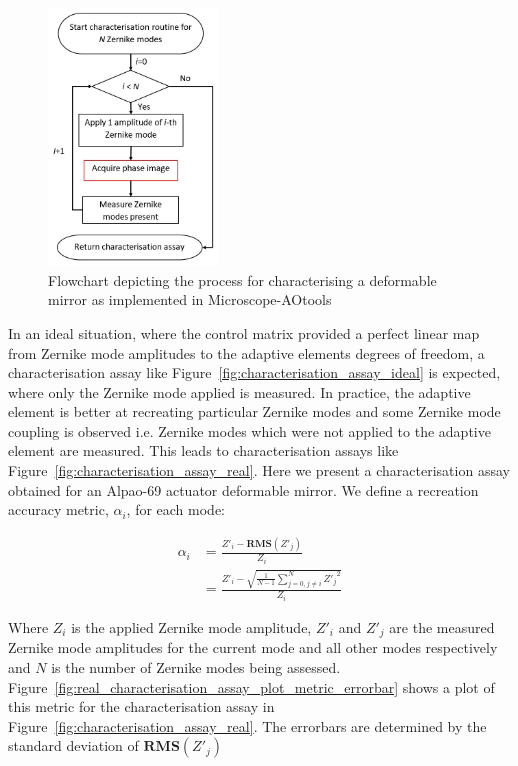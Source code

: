 \begin{figure}[h]
	\centering
	\includegraphics[width=0.4\textwidth, scale=0.5]{./images/characterisation_workflow.jpg}
	\caption[Characterisation routine workflow]{Flowchart depicting the process for characterising a deformable mirror as implemented in Microscope-AOtools}
	\label{fig:characterisation_workflow}
\end{figure}

In an ideal situation, where the control matrix provided a perfect linear map from Zernike mode amplitudes to the adaptive elements degrees of freedom, a characterisation assay like Figure~\ref{fig:characterisation_assay_ideal} is expected, where only the Zernike mode applied is measured. In practice, the adaptive element is better at recreating particular Zernike modes and some Zernike mode coupling is observed i.e. Zernike modes which were not applied to the adaptive element are measured. This leads to characterisation assays like Figure~\ref{fig:characterisation_assay_real}. Here we present a characterisation assay obtained for an Alpao-69 actuator deformable mirror. We define a recreation accuracy metric, $\alpha_{i}$, for each mode:

\begin{equation}\label{eq:recreation_accuracy}
\begin{split}
\alpha_{i} &= \frac{Z'_{i} - \boldsymbol{RMS}(Z'_{j})}{Z_{i}} \\
&= \frac{Z'_{i} - \sqrt{\frac{1}{N-1}\sum_{j=0,j\ne i}^{N} {Z'_{j}}^{2}}}{Z_{i}}
\end{split}
\end{equation}

Where $Z_{i}$ is the applied Zernike mode amplitude, $Z'_{i}$ and $Z'_{j}$ are the measured Zernike mode amplitudes for the current mode and all other modes respectively and $N$ is the number of Zernike modes being assessed. Figure~\ref{fig:real_characterisation_assay_plot_metric_errorbar} shows a plot of this metric for the characterisation assay in Figure~\ref{fig:characterisation_assay_real}. The errorbars are determined by the standard deviation of $\boldsymbol{RMS}(Z'_{j})$

